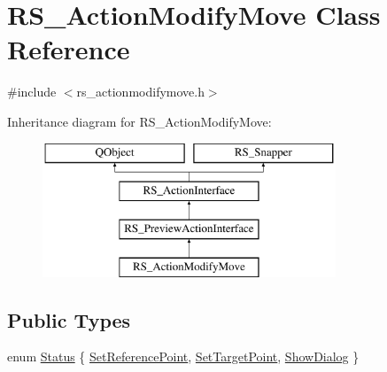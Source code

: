 \hypertarget{classRS__ActionModifyMove}{\section{R\-S\-\_\-\-Action\-Modify\-Move Class Reference}
\label{classRS__ActionModifyMove}
}


{\ttfamily \#include $<$rs\-\_\-actionmodifymove.\-h$>$}

Inheritance diagram for R\-S\-\_\-\-Action\-Modify\-Move\-:\begin{figure}[H]
\begin{center}
\leavevmode
\includegraphics[height=4.000000cm]{classRS__ActionModifyMove}
\end{center}
\end{figure}
\subsection*{Public Types}
\begin{DoxyCompactItemize}
\item 
enum \hyperlink{classRS__ActionModifyMove_a5e4281cd716ccea2929cd7122da8062a}{Status} \{ \hyperlink{classRS__ActionModifyMove_a5e4281cd716ccea2929cd7122da8062aaa1509242c1854d63830dbd3b56c8d961}{Set\-Reference\-Point}, 
\hyperlink{classRS__ActionModifyMove_a5e4281cd716ccea2929cd7122da8062aa959e91bed48d13f7bd0df0a7ad7e9498}{Set\-Target\-Point}, 
\hyperlink{classRS__ActionModifyMove_a5e4281cd716ccea2929cd7122da8062aa1fc53531494e76b82b4a64789a40983e}{Show\-Dialog}
 \}
\end{DoxyCompactItemize}
